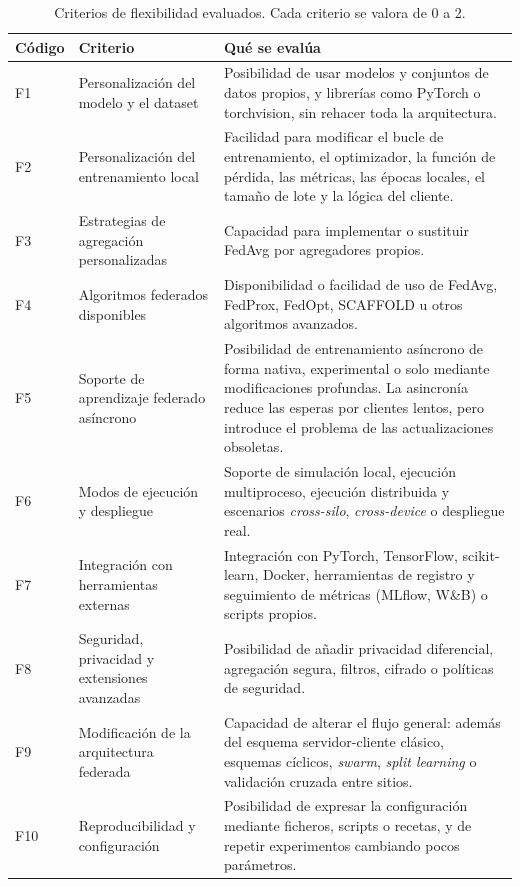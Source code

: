\begin{table}[htbp]
  \centering
  \small
  \caption{Criterios de flexibilidad evaluados. Cada criterio se valora de 0 a 2.}
  \label{tab:criterios-flex}
  \begin{tabular}{>{\ttfamily}l p{} p{}}
    \toprule
    \normalfont Código & \normalfont Criterio & \normalfont Qué se evalúa \\
    \midrule
    F1 & Personalización del modelo y el dataset &
    Posibilidad de usar modelos y conjuntos de datos propios, y librerías como PyTorch o
    torchvision, sin rehacer toda la arquitectura. \\
    \addlinespace
    F2 & Personalización del entrenamiento local &
    Facilidad para modificar el bucle de entrenamiento, el optimizador, la función de pérdida, las
    métricas, las épocas locales, el tamaño de lote y la lógica del cliente. \\
    \addlinespace
    F3 & Estrategias de agregación personalizadas &
    Capacidad para implementar o sustituir FedAvg por agregadores propios. \\
    \addlinespace
    F4 & Algoritmos federados disponibles &
    Disponibilidad o facilidad de uso de FedAvg, FedProx, FedOpt, SCAFFOLD u otros algoritmos
    avanzados. \\
    \addlinespace
    F5 & Soporte de aprendizaje federado asíncrono &
    Posibilidad de entrenamiento asíncrono de forma nativa, experimental o solo mediante
    modificaciones profundas. La asincronía reduce las esperas por clientes lentos, pero introduce
    el problema de las actualizaciones obsoletas. \\
    \addlinespace
    F6 & Modos de ejecución y despliegue &
    Soporte de simulación local, ejecución multiproceso, ejecución distribuida y escenarios
    \textit{cross-silo}, \textit{cross-device} o despliegue real. \\
    \addlinespace
    F7 & Integración con herramientas externas &
    Integración con PyTorch, TensorFlow, scikit-learn, Docker, herramientas de registro y
    seguimiento de métricas (MLflow, W\&B) o scripts propios. \\
    \addlinespace
    F8 & Seguridad, privacidad y extensiones avanzadas &
    Posibilidad de añadir privacidad diferencial, agregación segura, filtros, cifrado o políticas
    de seguridad. \\
    \addlinespace
    F9 & Modificación de la arquitectura federada &
    Capacidad de alterar el flujo general: además del esquema servidor-cliente clásico, esquemas
    cíclicos, \textit{swarm}, \textit{split learning} o validación cruzada entre sitios. \\
    \addlinespace
    F10 & Reproducibilidad y configuración &
    Posibilidad de expresar la configuración mediante ficheros, scripts o recetas, y de repetir
    experimentos cambiando pocos parámetros. \\
    \bottomrule
  \end{tabular}
\end{table}

